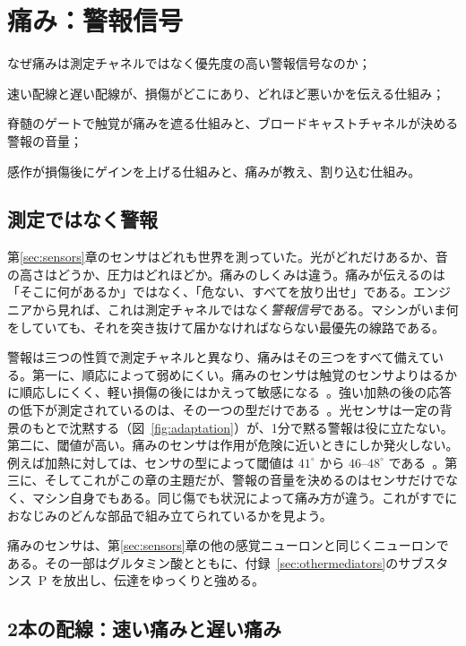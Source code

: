 \chapter{痛み：警報信号}
\label{sec:pain}
\begin{chaptergoals}
\item なぜ痛みは測定チャネルではなく優先度の高い警報信号なのか；
\item 速い配線と遅い配線が、損傷がどこにあり、どれほど悪いかを伝える仕組み；
\item 脊髄のゲートで触覚が痛みを遮る仕組みと、ブロードキャストチャネルが決める警報の音量；
\item 感作が損傷後にゲインを上げる仕組みと、痛みが教え、割り込む仕組み。
\end{chaptergoals}

\section{測定ではなく警報}

第\ref{sec:sensors}章のセンサはどれも世界を測っていた。光がどれだけあるか、音の高さはどうか、圧力はどれほどか。痛みのしくみは違う。痛みが伝えるのは「そこに何があるか」ではなく、「危ない、すべてを放り出せ」である。エンジニアから見れば、これは測定チャネルではなく\emph{警報信号}である。マシンがいま何をしていても、それを突き抜けて届かなければならない最優先の線路である。

警報は三つの性質で測定チャネルと異なり、痛みはその三つをすべて備えている。第一に、順応によって弱めにくい。痛みのセンサは触覚のセンサよりはるかに順応しにくく、軽い損傷の後にはかえって敏感になる~\cite{LaMotte1982hyper}。強い加熱の後の応答の低下が測定されているのは、その一つの型だけである~\cite{Treede1995heat}。光センサは一定の背景のもとで沈黙する（図~\ref{fig:adaptation}）が、1分で黙る警報は役に立たない。第二に、閾値が高い。痛みのセンサは作用が危険に近いときにしか発火しない。例えば加熱に対しては、センサの型によって閾値は $41^\circ$ から $46$--$48^\circ$ である~\cite{Treede1995heat, Weidner1999cfib}。第三に、そしてこれがこの章の主題だが、警報の音量を決めるのはセンサだけでなく、マシン自身でもある。同じ傷でも状況によって痛み方が違う。これがすでにおなじみのどんな部品で組み立てられているかを見よう。

痛みのセンサは、第\ref{sec:sensors}章の他の感覚ニューロンと同じくニューロンである。その一部はグルタミン酸とともに、付録~\ref{sec:othermediators}のサブスタンス~P を放出し、伝達をゆっくりと強める。

\section{2本の配線：速い痛みと遅い痛み}

